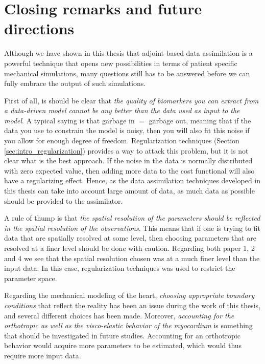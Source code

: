 \newpage
\section{Closing remarks and future directions}

Although we have shown in this thesis that
adjoint-based data assimilation is a powerful technique that opens new
possibilities in terms of patient specific mechanical simulations, many questions
still has to be answered before we can fully embrace the output of
such simulations.

First of all, is should be clear that \emph{the
  quality of biomarkers you can extract from a data-driven
  model cannot be any better than the data used as input to the
  model}. A typical saying is that garbage in $=$ garbage out,
meaning that if the data you use to constrain the model is noisy, then
you will also fit this noise if you allow for enough degree of
freedom. Regularization techniques (Section
\ref{sec:intro_regularization}) provides a way to attack this problem,
but it is not clear what is the best approach. If the noise in the
data is normally distributed with zero expected value, then adding
more data to the cost functional will also have a regularizing effect.
Hence, as the data assimilation techniques developed in this thesis
can take into account large amount of data, as much data as possible
should be provided to the assimilator.

A rule of thump is that \emph{the spatial resolution of the parameters should be
  reflected in the spatial resolution of the observations}. This means
that if one is trying to fit data that are spatially resolved at some level,
then choosing parameters that are resolved at a finer level should be
done with caution. Regarding both paper 1, 2 and 4 we see that the
spatial resolution chosen was at a much finer level than the input
data. In this case, regularization techniques was used to restrict the
parameter space. 



Regarding the mechanical modeling of the heart, 
\emph{choosing appropriate boundary conditions} that reflect the reality has
been an issue during the work of this thesis, and several different
choices has been made. Moreover, \emph{accounting for the orthotropic as
well as the visco-elastic behavior of the myocardium} is something that should
be investigated in future studies. Accounting for an orthotropic
behavior would acquire more parameters to be estimated, which would
thus require more input data.

